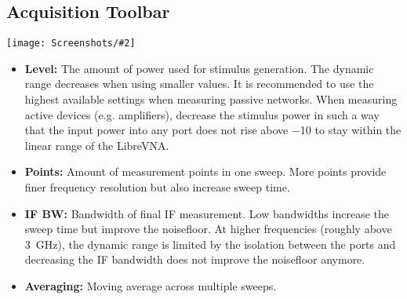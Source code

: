 \documentclass[a4paper,11pt]{article}
\newcommand{\vna}{LibreVNA}
\newcommand{\screenshot}[2]{\begin{center}
\texttt{[image: Screenshots/\#2]}
\end{center}}
\begin{document}
\subsection{Acquisition Toolbar}
\screenshot{0.7}{ToolbarVNAAcquisition.png}
\begin{itemize}
\item \textbf{Level:} The amount of power used for stimulus generation. The dynamic range decreases when using smaller values. It is recommended to use the highest available settings when measuring passive networks. When measuring active devices (e.g. amplifiers), decrease the stimulus power in such a way that the input power into any port does not rise above \SI{-10}{\dBm} to stay within the linear range of the \vna.
\item \textbf{Points:} Amount of measurement points in one sweep. More points provide finer frequency resolution but also increase sweep time.
\item \textbf{IF BW:} Bandwidth of final IF measurement. Low bandwidths increase the sweep time but improve the noisefloor. At higher frequencies (roughly above \SI{3}{\giga\hertz}), the dynamic range is limited by the isolation between the ports and decreasing the IF bandwidth does not improve the noisefloor anymore.
\item \textbf{Averaging:} Moving average across multiple sweeps.
\end{itemize}
\end{document}
